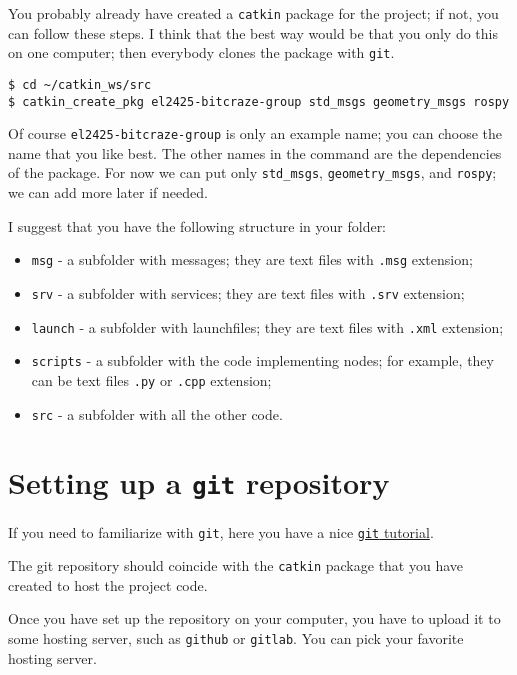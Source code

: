 You probably already have created a \texttt{catkin} package for the project; if not, you can follow these steps.
I think that the best way would be that you only do this on one computer; then everybody clones the package with \texttt{git}.

\begin{Verbatim}[fontsize=\small]
$ cd ~/catkin_ws/src
$ catkin_create_pkg el2425-bitcraze-group std_msgs geometry_msgs rospy
\end{Verbatim}

Of course \texttt{el2425-bitcraze-group} is only an example name;
you can choose the name that you like best.
The other names in the command are the dependencies of the package.
For now we can put only \verb|std_msgs|, \verb|geometry_msgs|, and \verb|rospy|;
we can add more later if needed.

I suggest that you have the following structure in your folder:

\begin{itemize}
  \item \verb|msg| - a subfolder with \ROS{} messages; they are text files with \verb|.msg| extension;
  \item \verb|srv| - a subfolder with \ROS{} services; they are text files with \verb|.srv| extension;
  \item \verb|launch| - a subfolder with \ROS{} launchfiles; they are text files with \verb|.xml| extension;
  \item \verb|scripts| - a subfolder with the code implementing \ROS{} nodes; for example, they can be text files \verb|.py| or \verb|.cpp| extension;
  \item \verb|src| - a subfolder with all the other code.
\end{itemize}







\section*{Setting up a \texttt{git} repository}

If you need to familiarize with \texttt{git}, here you have a nice \href{https://try.github.io/levels/1/challenges/1}{\texttt{git} tutorial}.

The git repository should coincide with the \texttt{catkin} package that you have created to host the project code.

Once you have set up the repository on your computer, you have to upload it to some hosting server, such as \texttt{github} or \texttt{gitlab}.
You can pick your favorite hosting server.

